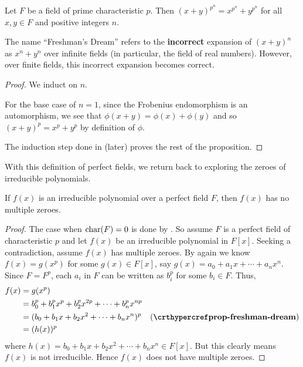 \begin{proposition}\label{prop-freshman-dream}
    Let $F$ be a field of prime characteristic $p$. Then $(x + y)^{p^n} = x^{p^n} + y^{p^n}$ for all $x,y \in F$ and positive integers $n$.
\end{proposition}
\begin{remark}
    The name ``Freshman's Dream'' refers to the \textbf{incorrect} expansion of $(x+y)^n$ as $x^n + y^n$ over infinite fields (in particular, the field of real numbers). However, over finite fields, this incorrect expansion becomes correct.
\end{remark}
\begin{proof}
    We induct on $n$.

    For the base case of $n = 1$, since the Frobenius endomorphism is an automorphism, we see that $\phi(x+y) = \phi(x) + \phi(y)$ and so $(x+y)^p = x^p + y^p$ by definition of $\phi$.

    The induction step done in  (later) proves the rest of the proposition.
\end{proof}

With this definition of perfect fields, we return back to exploring the zeroes of irreducible polynomials.

\begin{theorem}\label{thrm-irreducible-polynomial-over-perfect-field-has-no-multiple-zeroes}
    If $f(x)$ is an irreducible polynomial over a perfect field $F$, then $f(x)$ has no multiple zeroes.
\end{theorem}
\begin{proof}
    The case when $\mathrm{char}(F) = 0$ is done by . So assume $F$ is a perfect field of characteristic $p$ and let $f(x)$ be an irreducible polynomial in $F[x]$. Seeking a contradiction, assume $f(x)$ has multiple zeroes. By  again we know $f(x) = g(x^p)$ for some $g(x) \in F[x]$, say $g(x) = a_0 + a_1x + \cdots + a_nx^n$. Since $F = F^p$, each $a_i$ in $F$ can be written as $b_i^p$ for some $b_i \in F$. Thus,
    \begin{align*}
        f(x) &= g(x^p)\\
        &= b_0^p + b_1^px^p + b_2^px^{2p} + \cdots + b_n^px^{np}\\
        &= (b_0 + b_1x + b_2x^2 + \cdots + b_nx^n)^p & (\myref{prop-freshman-dream})\\
        &= (h(x))^p
    \end{align*}
    where $h(x) = b_0 + b_1x + b_2x^2 + \cdots + b_nx^n \in F[x]$. But this clearly means $f(x)$ is not irreducible. Hence $f(x)$ does not have multiple zeroes.
\end{proof}

